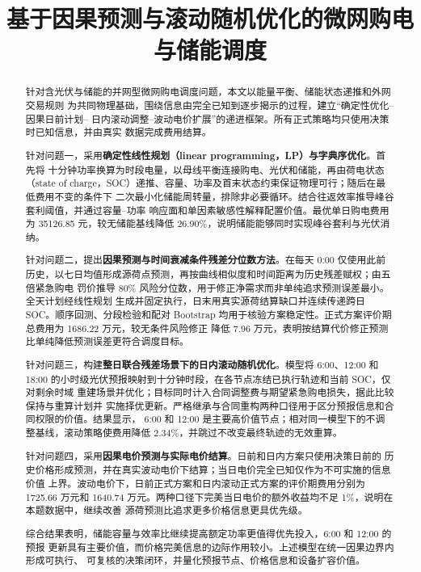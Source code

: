 \documentclass[withoutpreface,bwprint]{cumcmthesis}
\title{基于因果预测与滚动随机优化的微网购电与储能调度}
\begin{document}
\maketitle

\begin{abstract}
针对含光伏与储能的并网型微网购电调度问题，本文以能量平衡、储能状态递推和外网交易规则
为共同物理基础，围绕信息由完全已知到逐步揭示的过程，建立“确定性优化--因果日前计划--
日内滚动调整--波动电价扩展”的递进框架。所有正式策略均只使用决策时已知信息，并由真实
数据完成费用结算。

针对问题一，采用\textbf{确定性线性规划（linear programming，LP）与字典序优化}。首先将
十分钟功率换算为时段电量，以母线平衡连接购电、光伏和储能，再由荷电状态（state of
charge，SOC）递推、容量、功率及首末状态约束保证物理可行；随后在最低费用不变的条件下
二次最小化储能周转量，排除非必要循环。结合往返效率推导峰谷套利阈值，并通过容量--功率
响应面和单因素敏感性解释配置价值。最优单日购电费用为 35126.85 元，较无储能基线降低
26.90\%，说明储能能够同时实现峰谷套利与光伏消纳。

针对问题二，提出\textbf{因果预测与时间衰减条件残差分位数方法}。在每天 0:00 仅使用此前
历史，以七日均值形成源荷点预测，再按曲线相似度和时间距离为历史残差赋权；由五倍紧急购电
罚价推导 80\% 风险分位数，用于修正净需求而非单纯追求预测误差最小。全天计划经线性规划
生成并固定执行，日末用真实源荷结算缺口并连续传递跨日 SOC。顺序回测、分段检验和配对
Bootstrap 均用于核验方案稳定性。正式方案评价期总费用为 1686.22 万元，较无条件风险修正
降低 7.96 万元，表明按结算代价修正预测比单纯降低预测误差更符合调度目标。

针对问题三，构建\textbf{整日联合残差场景下的日内滚动随机优化}。模型将 6:00、12:00 和
18:00 的小时级光伏预报映射到十分钟时段，在各节点冻结已执行轨迹和当前 SOC，仅对剩余时域
重建场景并优化；目标同时计入合同调整费与期望紧急购电损失，据此比较保持与重算计划并
实施择优更新。严格继承与合同重构两种口径用于区分预报信息和合同权限的价值。结果显示，
6:00 和 12:00 是主要高价值节点；相对同一模型下的不调整基线，滚动策略使费用降低
2.34\%，并跳过不改变最终轨迹的无效重算。

针对问题四，采用\textbf{因果电价预测与实际电价结算}。日前和日内方案只使用决策日前的
历史价格形成预测，并在真实波动电价下结算；当日电价完全已知仅作为不可实施的信息价值
上界。波动电价下，日前正式方案和日内滚动正式方案的评价期费用分别为 1725.66 万元和
1640.74 万元。两种口径下完美当日电价的额外收益均不足 1\%，说明在本题数据中，继续改善
源荷预测比追求更多价格信息更具优先级。

综合结果表明，储能容量与效率比继续提高额定功率更值得优先投入，6:00 和 12:00 的预报
更新具有主要价值，而价格完美信息的边际作用较小。上述模型在统一因果边界内形成可执行、
可复核的决策闭环，并量化预报节点、价格信息和设备扩容价值。

\end{abstract}
\end{document}
